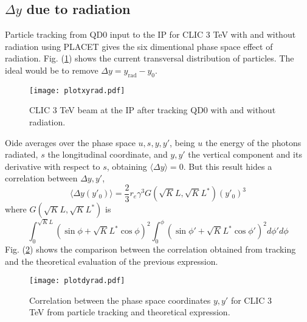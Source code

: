 \subsection{$\Delta y$ due to radiation}
Particle tracking from QD0 input to the IP for CLIC 3 TeV with and without radiation using PLACET \cite{Placet} gives the six dimentional phase space effect of radiation. Fig. (\ref{f:CLIC3TeVbeamsizeIP}) shows the current transversal distribution of particles. The ideal would be to remove $\Delta y = y_\text{rad} -y_0$.\par
\begin{figure}[!htb]
\centering
 \texttt{[image: plotxyrad.pdf]}\caption{CLIC 3 TeV beam at the IP after tracking QD0 with and without radiation.}\label{f:CLIC3TeVbeamsizeIP}
\end{figure}
Oide averages over the phase space $u,s,y,y'$, being $u$ the energy of the photons radiated, $s$ the longitudinal coordinate, and $y,y'$ the vertical component and its derivative with respect to $s$, obtaining $\langle \Delta y \rangle = 0$. But this result hides a correlation between $\Delta y, y'$, %
\begin{equation}
 \langle\Delta y (y'_0)\rangle = \frac{2}{3}r_e\gamma^3G(\sqrt{K}L,\sqrt{K}L^*)(y'_0)^3
\end{equation}
where $G(\sqrt{K}L,\sqrt{K}L^*)$ is
{\scriptsize
\begin{equation}
\int_0^{\sqrt{K}L}(\sin\phi+\sqrt{K}L^*\cos\phi)^2\int_0^\phi (\sin\phi'+\sqrt{K}L^*\cos\phi')^2 d\phi'd\phi
\end{equation}
}
Fig. (\ref{f:correlation}) shows the comparison between the correlation obtained from tracking and the theoretical evaluation of the previous expression.
\begin{figure}[!htb]
\centering
\texttt{[image: plotdyrad.pdf]}\caption{Correlation between the phase space coordinates $y,y'$ for CLIC 3 TeV from particle tracking and theoretical expression.}\label{f:correlation}
\end{figure}

